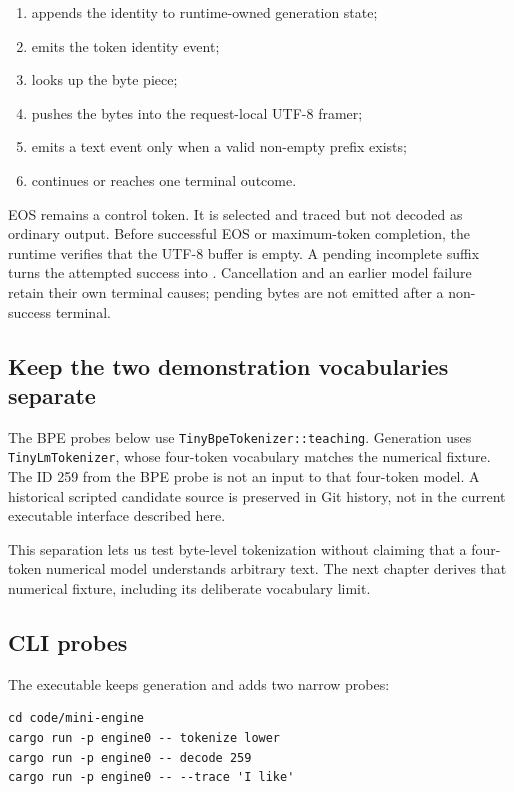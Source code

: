 \begin{enumerate}
\def\labelenumi{\arabic{enumi}.}
\tightlist
\item
  appends the identity to runtime-owned generation state;
\item
  emits the token identity event;
\item
  looks up the byte piece;
\item
  pushes the bytes into the request-local UTF-8 framer;
\item
  emits a text event only when a valid non-empty prefix exists;
\item
  continues or reaches one terminal outcome.
\end{enumerate}

EOS remains a control token. It is selected and traced but not decoded
as ordinary output. Before successful EOS or maximum-token completion,
the runtime verifies that the UTF-8 buffer is empty. A pending
incomplete suffix turns the attempted success into
\texttt{}. Cancellation and an earlier
model failure retain their own terminal causes; pending bytes are not
emitted after a non-success terminal.

\subsection{Keep the two demonstration vocabularies separate}
\label{separate-demonstration-vocabularies}
The BPE probes below use \texttt{TinyBpeTokenizer::teaching}. Generation uses
\texttt{TinyLmTokenizer}, whose four-token vocabulary matches the numerical
fixture. The ID 259 from the BPE probe is not an input to that four-token
model. A historical scripted candidate source is preserved in Git history,
not in the current executable interface described here.

This separation lets us test byte-level tokenization without claiming that a
four-token numerical model understands arbitrary text. The next chapter
derives that numerical fixture, including its deliberate vocabulary limit.

\subsection{CLI probes}\label{cli-probes}

The executable keeps generation and adds two narrow probes:

\begin{verbatim}
cd code/mini-engine
cargo run -p engine0 -- tokenize lower
cargo run -p engine0 -- decode 259
cargo run -p engine0 -- --trace 'I like'
\end{verbatim}

